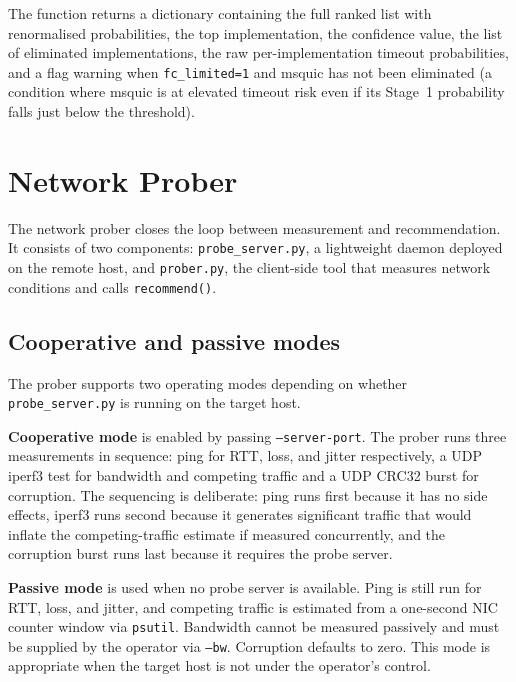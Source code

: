 The function returns a dictionary containing the full ranked list with
renormalised probabilities, the top implementation, the confidence value,
the list of eliminated implementations, the raw per-implementation timeout
probabilities, and a flag warning when \texttt{fc\_limited=1} and msquic
has not been eliminated (a condition where msquic is at elevated timeout
risk even if its Stage~1 probability falls just below the threshold).

\section{Network Prober}
\label{sec:prober}

The network prober closes the loop between measurement and recommendation.
It consists of two components: \texttt{probe\_server.py}, a lightweight
daemon deployed on the remote host, and \texttt{prober.py}, the client-side
tool that measures network conditions and calls \texttt{recommend()}.

\subsection{Cooperative and passive modes}
\label{subsec:probe-modes}

The prober supports two operating modes depending on whether
\texttt{probe\_server.py} is running on the target host.

\textbf{Cooperative mode} is enabled by passing \texttt{--server-port}.
The prober runs three measurements in sequence: ping for RTT, loss, and
jitter respectively, a UDP iperf3 test for bandwidth and competing traffic
and a UDP CRC32 burst for corruption. The sequencing is deliberate: ping
runs first because it has no side effects, iperf3 runs second because it
generates significant traffic that would inflate the competing-traffic
estimate if measured concurrently, and the corruption burst runs last
because it requires the probe server.

\textbf{Passive mode} is used when no probe server is available. Ping is
still run for RTT, loss, and jitter, and competing traffic is estimated
from a one-second NIC counter window via \texttt{psutil}. Bandwidth cannot
be measured passively and must be supplied by the operator via
\texttt{--bw}. Corruption defaults to zero. This mode is appropriate when
the target host is not under the operator's control.

